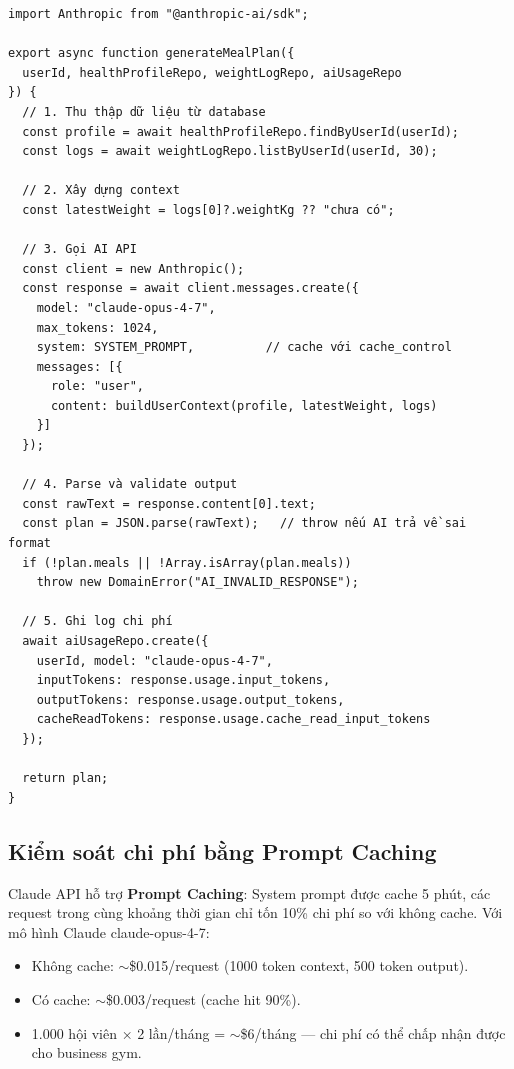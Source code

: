\begin{verbatim}
import Anthropic from "@anthropic-ai/sdk";

export async function generateMealPlan({
  userId, healthProfileRepo, weightLogRepo, aiUsageRepo
}) {
  // 1. Thu thập dữ liệu từ database
  const profile = await healthProfileRepo.findByUserId(userId);
  const logs = await weightLogRepo.listByUserId(userId, 30);

  // 2. Xây dựng context
  const latestWeight = logs[0]?.weightKg ?? "chưa có";

  // 3. Gọi AI API
  const client = new Anthropic();
  const response = await client.messages.create({
    model: "claude-opus-4-7",
    max_tokens: 1024,
    system: SYSTEM_PROMPT,          // cache với cache_control
    messages: [{
      role: "user",
      content: buildUserContext(profile, latestWeight, logs)
    }]
  });

  // 4. Parse và validate output
  const rawText = response.content[0].text;
  const plan = JSON.parse(rawText);   // throw nếu AI trả về sai format
  if (!plan.meals || !Array.isArray(plan.meals))
    throw new DomainError("AI_INVALID_RESPONSE");

  // 5. Ghi log chi phí
  await aiUsageRepo.create({
    userId, model: "claude-opus-4-7",
    inputTokens: response.usage.input_tokens,
    outputTokens: response.usage.output_tokens,
    cacheReadTokens: response.usage.cache_read_input_tokens
  });

  return plan;
}
\end{verbatim}

\subsection{Kiểm soát chi phí bằng Prompt Caching}
Claude API hỗ trợ \textbf{Prompt Caching}: System prompt được cache 5 phút, các request trong cùng khoảng thời gian chỉ tốn 10\% chi phí so với không cache. Với mô hình Claude claude-opus-4-7:
\begin{itemize}
    \item Không cache: $\sim$\$0.015/request (1000 token context, 500 token output).
    \item Có cache: $\sim$\$0.003/request (cache hit 90\%).
    \item 1.000 hội viên × 2 lần/tháng = $\sim$\$6/tháng — chi phí có thể chấp nhận được cho business gym.
\end{itemize}

